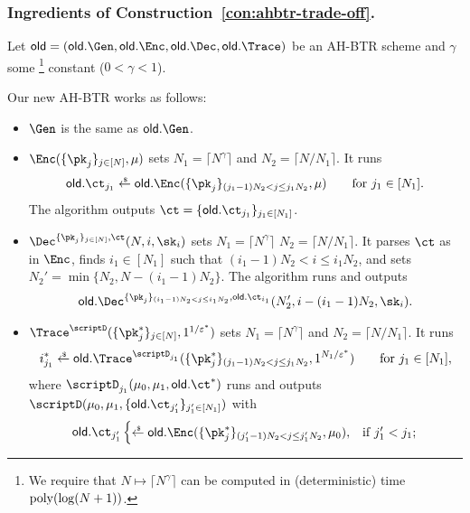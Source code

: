 \subsubsection{Ingredients of Construction~\ref{con:ahbtr-trade-off}.}
Let ${\OLD=(\OLD.\Gen,\OLD.\Enc,\OLD.\Dec,\OLD.\Trace)}$ be an AH-BTR scheme and
$\gamma$ some%
\footnote{We require that ${N\mapsto\lceil N^\gamma\rceil}$ can be computed in (deterministic) time ${\operatorname{poly}(\log(N+1))}$.}
constant (${0<\gamma<1}$).

\begin{construction}\label{con:ahbtr-trade-off}
Our new AH-BTR works as follows:
\begin{itemize}
\item $\Gen$ is the same as $\OLD.\Gen$.
\item $\Enc(\{\pk_j\}_{j\in[N]},\mu)$ sets
${N_1=\lceil N^\gamma\rceil}$ and
${N_2=\lceil N/N_1\rceil}$.
It runs
\begin{align*}
\OLD.\ct_{j_1}\draws\OLD.\Enc(\{\pk_j\}_{(j_1-1)N_2<j\leq j_1N_2},\mu)
\qquad\textup{for }j_1\in[N_1].
\end{align*}
The algorithm outputs ${\ct=\{\OLD.\ct_{j_1}\}_{j_1\in[N_1]}}$.
\item $\Dec^{\{\pk_j\}_{j\in[N]},\ct}(N,i,\sk_i)$ sets
${N_1=\lceil N^\gamma\rceil}$
${N_2=\lceil N/N_1\rceil}$.
It parses $\ct$ as in $\Enc$,
finds ${i_1\in[N_1]}$ such that ${(i_1-1)N_2<i\leq i_1N_2}$, and
sets ${N_2'=\min{\{N_2,N-(i_1-1)N_2\}}}$.
The algorithm runs and outputs
\begin{align*}
\OLD.\Dec^{\{\pk_j\}_{(i_1-1)N_2<j\leq i_1N_2},\OLD.\ct_{i_1}}
(N_2',i-(i_1-1)N_2,\sk_i).
\end{align*}
\item $\Trace^\scriptD(\{\pk^\ast_j\}_{j\in[N]},1^{1/\epsilon^\ast})$ sets
${N_1=\lceil N^\gamma\rceil}$ and
${N_2=\lceil N/N_1\rceil}$.
It runs
\begin{align*}
i^\ast_{j_1}\draws\OLD.\Trace^{\scriptD_{j_1}}(\{\pk^\ast_j\}_{(j_1-1)N_2<j\leq j_1N_2},1^{N_1/\epsilon^\ast})
\qquad\textup{for }j_1\in[N_1],
\end{align*}
where
$\scriptD_{j_1}(\mu_0,\mu_1,\OLD.\ct^\ast)$
runs and outputs
$\scriptD(\mu_0,\mu_1,\{\OLD.\ct_{j_1'}\}_{j_1'\in[N_1]})$
with
\begin{align*}
\OLD.\ct_{j_1'}\begin{cases}
\draws\OLD.\Enc(\{\pk^\ast_j\}_{(j_1'-1)N_2<j\leq j_1'N_2},\mu_0),&
\textup{if }j_1'<j_1;\\

\end{cases}
\end{align*}
\end{itemize}
\end{construction}
